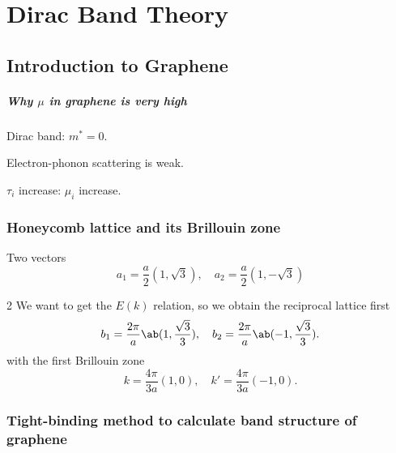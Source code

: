 
\chapter{Dirac Band Theory}

\section{Introduction to Graphene}

\paragraph{Why $\mu$ in graphene is very high}
\begin{enumext}
  \item Dirac band: $m^* = 0$.
  \item Electron-phonon scattering is weak.
  \item $\tau_i$ increase: $\mu_i$ increase.
\end{enumext}

\subsection{Honeycomb lattice and its Brillouin zone}

Two vectors
\[
  a_1 = \frac a2(1,\sqrt3), \quad
  a_2 = \frac a2(1,-\sqrt3)
\]
\begin{paracol}{2}
We want to get the $E(k)$ relation, so we obtain the reciprocal lattice first
\[
  b_1 = \frac{2\pi}{a}\ab(1, \frac{\sqrt3}{3}),\quad
  b_2 = \frac{2\pi}{a}\ab(-1, \frac{\sqrt3}{3}).
\]
with the first Brillouin zone
\[
  k = \frac{4\pi}{3a}(1,0), \quad k' = \frac{4\pi}{3a}(-1,0).
\]
\switchcolumn \centering
\end{paracol}

\subsection{Tight-binding method to calculate band structure of graphene}


